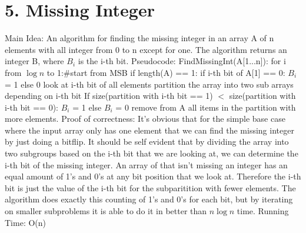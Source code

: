 \documentclass[11pt]{article}
\begin{document}
\section*{5. Missing Integer}
Main Idea:\newline
An algorithm for finding the missing integer in an array A of n elements with all integer from 0 to n except for one. The algorithm returns an integer B, where $B_i$ is the i-th bit.
\newline
Pseudocode:\newline
FindMissingInt(A[1...n]):\newline
\indent for i from $\log n$ to 1:\indent \#start from MSB\newline 
\indent \indent if length(A) == 1:\newline
\indent \indent \indent if i-th bit of A[1] == 0:\newline
\indent \indent \indent \indent $B_i$ = 1 else 0\newline
\indent \indent look at i-th bit of all elements\newline
\indent \indent partition the array into two sub arrays 
depending on i-th bit\newline
\indent \indent If size(partition with i-th bit == 1) $<$ size(partition with i-th bit == 0):\newline
\indent \indent \indent $B_i$ = 1 else $B_i$ =  0 \newline
\indent \indent remove from A all items in the partition with more elements.\newline
\newline
Proof of correctness:\newline
It's obvious that for the simple base case where the input array only has one element that we can find the missing integer by just doing a bitflip. It should be self evident that by dividing the array into two subgroups based on the i-th bit that we are looking at, we can determine the i-th bit of the missing integer. An array of that isn't missing an integer has an equal amount of 1's and  0's at any bit position that we look at. Therefore the i-th bit is just the value of the i-th bit for the subparitition with fewer elements. The algorithm does exactly this counting of 1's and 0's for each bit, but by iterating on smaller subproblems it is able to do it in better than $n\log n$ time.
\newline
\newline
Running Time: O(n)\newline
\newline
\end{document}
